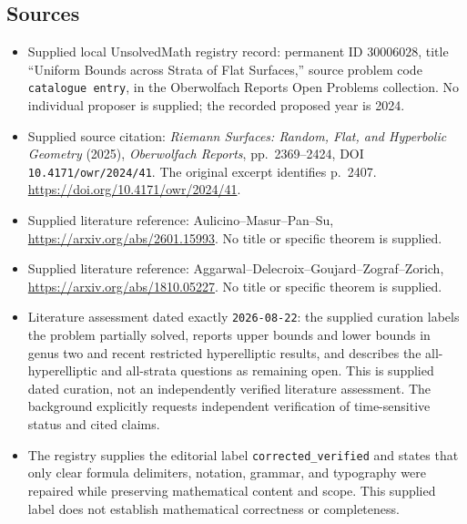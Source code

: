 \documentclass[11pt]{article}
\begin{document}
\subsection{Sources}
\begin{itemize}
\item Supplied local UnsolvedMath registry record: permanent ID \(30006028\), title ``Uniform Bounds across Strata of Flat Surfaces,'' source problem code \texttt{catalogue entry}, in the Oberwolfach Reports Open Problems collection. No individual proposer is supplied; the recorded proposed year is 2024.
\item Supplied source citation: \emph{Riemann Surfaces: Random, Flat, and Hyperbolic Geometry} (2025), \emph{Oberwolfach Reports}, pp.\ 2369--2424, DOI \texttt{10.4171/owr/2024/41}. The original excerpt identifies p.\ 2407. \url{https://doi.org/10.4171/owr/2024/41}.
\item Supplied literature reference: Aulicino--Masur--Pan--Su, \url{https://arxiv.org/abs/2601.15993}. No title or specific theorem is supplied.
\item Supplied literature reference: Aggarwal--Delecroix--Goujard--Zograf--Zorich, \url{https://arxiv.org/abs/1810.05227}. No title or specific theorem is supplied.
\item Literature assessment dated exactly \texttt{2026-08-22}: the supplied curation labels the problem partially solved, reports upper bounds and lower bounds in genus two and recent restricted hyperelliptic results, and describes the all-hyperelliptic and all-strata questions as remaining open. This is supplied dated curation, not an independently verified literature assessment. The background explicitly requests independent verification of time-sensitive status and cited claims.
\item The registry supplies the editorial label \texttt{corrected\_verified} and states that only clear formula delimiters, notation, grammar, and typography were repaired while preserving mathematical content and scope. This supplied label does not establish mathematical correctness or completeness.
\end{itemize}
\end{document}
